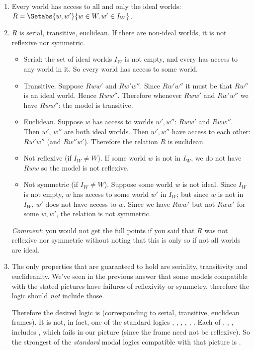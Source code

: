 \documentclass[../../../../include/open-logic-section]{subfiles}
\begin{document}
\begin{prob}
\begin{ans}
	\begin{enumerate}
	\item Every world has access to all and only the ideal worlds: 
	$R=\Setabs{w,w'}{w\in W,w'\in I_W}$. 
	\item $R$ is serial, transitive, euclidean. If there are non-ideal worlds, 
	it is not reflexive nor symmetric.
	\begin{itemize}
		\item Serial: the set of ideal worlds $I_W$ is not empty, and every
		has access to any world in it. So every world has access to some world.
		\item Transitive. Suppose $Rww'$ and $Rw'w''$. Since $Rw'w''$ 
		it must be that $Rw''$ is an ideal world. Hence $Rww''$. Therefore
		whenever $Rww'$ and $Rw'w''$ we have $Rww''$: the model is transitive.
		\item Euclidean. Suppose $w$ has access to worlds $w',w''$: 
		$Rww'$ and $Rww''$. Then $w'$, $w''$ are both ideal worlds. 
		Then $w',w''$ have access to each other: $Rw'w''$ (and $Rw''w'$). 
		Therefore the relation $R$ is euclidean.
		\item Not reflexive (if $I_W\neq W$). If some world $w$ is not 
		in $I_W$, we do not have $Rww$ so the model is not reflexive.
		\item Not symmetric (if $I_W\neq W$). Suppose some world $w$ is 
		not ideal. Since $I_W$ is not empty, $w$ has access to some world 
		$w'$ in $I_W$; but since $w$ is not in $I_W$, $w'$ does not have 
		access to $w$. Since we have $Rww'$ but not $Rww'$ for some $w,w'$,
		the relation is not symmetric.
	\end{itemize}
	\emph{Comment}: you would not get the full points if you said that 
	$R$ was not reflexive nor symmetric without noting that this is 
	only so if not all worlds are ideal.

	\item The only properties that are guaranteed to hold are seriality,
	transitivity and euclideanity. We've seen in the previous answer 
	that some models compatible with the stated pictures have failures
	of reflexivity or symmetry, therefore the logic should \emph{not}
	include those. 

	Therefore the desired logic is  (corresponding to 
	serial, transitive, euclidean frames). It is not, in fact, 
	one of the standard logics  
	, , , , , . Each of 
	, , ,  includes , which fails
	in our picture (since the frame need not be reflexive). So the 
	strongest of the \emph{standard} modal logics compatible with 
	that picture is . 


\end{enumerate}
\end{ans}
\end{prob}
\end{document}
